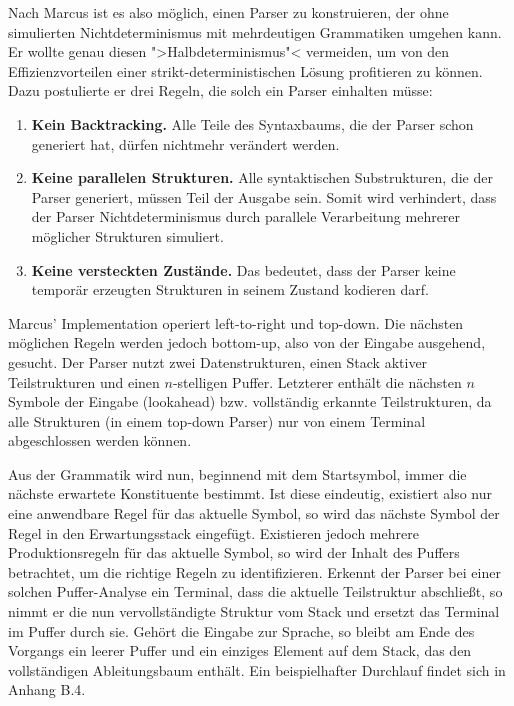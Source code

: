 \documentclass[12pt,a4paper]{article}
\theoremstyle{definition}
\begin{document}
		
			Nach Marcus ist es also möglich, einen Parser zu konstruieren, der ohne simulierten Nichtdeterminismus mit mehrdeutigen Grammatiken umgehen kann. Er wollte genau diesen ">Halbdeterminismus"< vermeiden, um von den Effizienzvorteilen einer strikt-deterministischen Lösung profitieren zu können. Dazu postulierte er drei Regeln, die solch ein Parser einhalten müsse:
		
				\begin{enumerate}
				\item{\textbf{Kein Backtracking.} Alle Teile des Syntaxbaums, die der Parser schon generiert hat, dürfen nichtmehr verändert werden.}
				\item{
					\textbf{Keine parallelen Strukturen.} Alle syntaktischen Substrukturen, die der Parser generiert, müssen Teil der Ausgabe sein. Somit wird verhindert, dass der Parser Nichtdeterminismus durch parallele Verarbeitung mehrerer möglicher Strukturen simuliert.
				}
				\item{\textbf{Keine versteckten Zustände.} Das bedeutet, dass der Parser keine temporär erzeugten Strukturen in seinem Zustand kodieren darf.}
				\end{enumerate}
		
			Marcus' Implementation operiert left-to-right und top-down. Die nächsten möglichen Regeln werden jedoch bottom-up, also von der Eingabe ausgehend, gesucht. Der Parser nutzt zwei Datenstrukturen, einen Stack aktiver Teilstrukturen und einen $n$-stelligen Puffer. Letzterer enthält die nächsten $n$ Symbole der Eingabe (lookahead) bzw. vollständig erkannte Teilstrukturen, da alle Strukturen (in einem top-down Parser) nur von einem Terminal abgeschlossen werden können.
		
			Aus der Grammatik wird nun, beginnend mit dem Startsymbol, immer die nächste erwartete Konstituente bestimmt. Ist diese eindeutig, existiert also nur eine anwendbare Regel für das aktuelle Symbol, so wird das nächste Symbol der Regel in den Erwartungsstack eingefügt. Existieren jedoch mehrere Produktionsregeln für das aktuelle Symbol, so wird der Inhalt des Puffers betrachtet, um die richtige Regeln zu identifizieren. Erkennt der Parser bei einer solchen Puffer-Analyse ein Terminal, dass die aktuelle Teilstruktur abschließt, so nimmt er die nun vervollständigte Struktur vom Stack und ersetzt das Terminal im Puffer durch sie. Gehört die Eingabe zur Sprache, so bleibt am Ende des Vorgangs ein leerer Puffer und ein einziges Element auf dem Stack, das den vollständigen Ableitungsbaum enthält. Ein beispielhafter Durchlauf findet sich in Anhang B.4.
		
\end{document}
